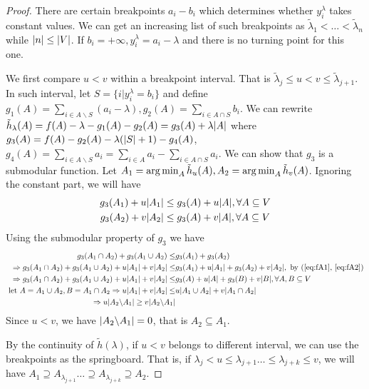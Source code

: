 \documentclass{article}
\begin{document}
\begin{proof}
There are certain breakpoints $a_i - b_i$ which determines whether $y_i^{\lambda}$ takes constant values. We can get an increasing list of such breakpoints as $\tilde{\lambda}_1 < \dots < \tilde{\lambda}_n$ while $\lvert n\rvert\leq \lvert V\rvert$. If $b_i = +\infty, y^{\lambda}_i = a_i - \lambda$ and there is no turning point for this one.

We first compare $ u < v $ within a breakpoint interval. That is $\tilde{\lambda}_j \leq u < v \leq \tilde{\lambda}_{j+1}$. In such interval, let $S = \{i | y^{\lambda}_i = b_i\}$ and define $g_1(A) = \sum_{i\in A\backslash S} (a_i - \lambda), g_2(A)= \sum_{i \in A \cap S} b_i$. We can rewrite $\tilde{h}_{\lambda}(A) = f(A) - \lambda - g_1(A) - g_2(A) = g_3(A) + \lambda\lvert A\rvert$ where $g_3(A)=f(A)-g_2(A)-\lambda(\lvert S\rvert+1) - g_4(A)$, $g_4(A) = \sum_{i\in A\backslash S} a_i = \sum_{i \in A} a_i - \sum_{i \in A\cap S} a_i $. We can show that $g_3$ is a submodular function.
Let $A_1 = \operatorname*{arg\,min}_{A} \tilde{h}_u(A), A_2 = \operatorname*{arg\,min}_{A} \tilde{h}_v(A)$. Ignoring the constant part, we will have
\begin{align}
g_3(A_1) + u \lvert A_1\rvert& \leq g_3(A) + u \lvert A\rvert, \forall A \subseteq V \label{eq:fA1}\\
g_3(A_2) + v \lvert A_2\rvert& \leq g_3(A) + v \lvert A\rvert, \forall A \subseteq V \label{eq:fA2}
\end{align}
Using the submodular property of $g_3$ we have
\begin{align*}
g_3(A_1 \cap A_2) + g_3(A_1 \cup A_2)\leq  &g_3(A_1) + g_3(A_2) \\
\Rightarrow g_3(A_1 \cap A_2) + g_3(A_1 \cup A_2) + u \lvert A_1\rvert + v\lvert A_2\rvert 
\leq & g_3(A_1) + u \lvert A_1\rvert + g_3(A_2) + v \lvert A_2\rvert, \textrm{ by (\ref{eq:fA1}, \ref{eq:fA2})} \\
\Rightarrow g_3(A_1 \cap A_2) + g_3(A_1 \cup A_2) + u \lvert A_1\rvert + v\lvert A_2\rvert 
\leq &g_3(A) + u \lvert A\rvert+ g_3(B) + v \lvert B\rvert, \forall A, B \subseteq V \\
\textrm{ let } A =A_1 \cup A_2, B= A_1 \cap A_2 \Rightarrow u \lvert A_1\rvert + v\lvert A_2\rvert 
\leq & u \lvert A_1 \cup A_2\rvert+ v \lvert A_1\cap A_2\rvert \\
\Rightarrow u  \lvert A_2 \backslash A_1\rvert \geq v \lvert A_2 \backslash A_1\rvert
\end{align*}
Since $ u < v$, we have $\lvert A_2 \backslash A_1\rvert=0$, that is $A_2 \subseteq A_1$.

By the continuity of $\tilde{h}(\lambda)$, if $u<v$ belongs to different interval, we can use the breakpoints as the springboard. That is, if $\lambda_j < u \leq \lambda_{j+1} \dots \leq \lambda_{j+k} \leq v$,  we will have $ A_1 \supseteq A_{\lambda_{j+1}} \dots \supseteq A_{\lambda_{j+k}} \supseteq A_2$.
\end{proof}
\end{document}
